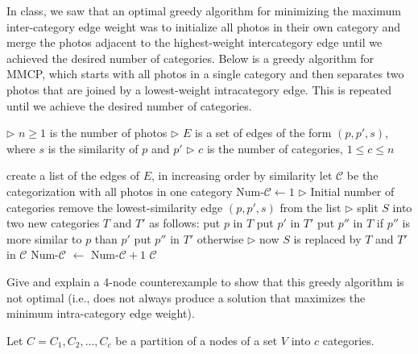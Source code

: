 \begin{questions}
	\question[2] In class, we saw that an optimal greedy algorithm for minimizing the maximum inter-category edge weight was to initialize all photos in their own category and merge the photos adjacent to the highest-weight intercategory edge until we achieved the desired number of categories. Below is a greedy algorithm for MMCP, which starts with all photos in a single category and then separates two photos that are joined by a lowest-weight intracategory edge. This is repeated until we achieve the desired number of categories.

	\begin{algorithmic}
		\Statex $\triangleright$ $n \ge 1$ is the number of photos
		\Statex $\triangleright$ $E$ is a set of edges of the form $(p,p',s)$, where $s$ is the similarity of $p$ and $p'$
		\Statex $\triangleright$ $c$ is the number of categories, $1 \le c \le n$

		\State create a list of the edges of $E$, in increasing order by similarity
		\State let $\mathcal{C}$ be the categorization with all photos in one category
		\State Num-$\mathcal{C}\gets 1$ \hspace{.5in} $\triangleright$ Initial number of categories
		\State remove the lowest-similarity edge $(p,p',s)$ from the list
		\State $\triangleright$ split $S$ into two new categories $T$ and $T'$ as follows:
		\State put $p$ in $T$
		\State put $p'$ in $T'$
		\State put $p''$ in $T$ if $p''$ is more similar to $p$ than $p'$
		\State put $p''$ in $T'$ otherwise
		\EndFor
		\State $\triangleright$ now $S$ is replaced by $T$ and $T'$ in $\mathcal{C}$
		\State Num-$\mathcal{C}$ $\gets$ Num-$\mathcal{C}+1$
		\EndIf
		\EndWhile
		 $\mathcal{C}$
		\EndFunction
	\end{algorithmic}

	Give and explain a 4-node counterexample to show that this greedy algorithm is not optimal (i.e., does not always produce a solution that maximizes the minimum intra-category edge weight).

	\ifsolutions\fi

	\begin{soln}

		Let \(C = {C_1, C_2, \dots, C_c}\) be a partition of a nodes of a set \(V\) into \(c\) categories.


\end{soln}
\end{questions}
